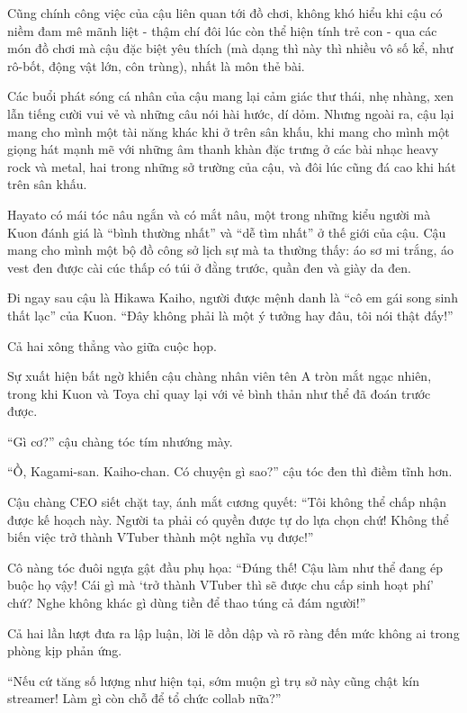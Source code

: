 \documentclass[../main.tex]{subfiles}
\begin{document}
Cũng chính công việc của cậu liên quan tới đồ chơi, không khó hiểu khi cậu có niềm đam mê mãnh liệt - thậm chí đôi lúc còn thể hiện tính trẻ con - qua các món đồ chơi mà cậu đặc biệt yêu thích (mà dạng thì này thì nhiều vô số kể, như rô-bốt, động vật lớn, côn trùng), nhất là môn thẻ bài.

Các buổi phát sóng cá nhân của cậu mang lại cảm giác thư thái, nhẹ nhàng, xen lẫn tiếng cười vui vẻ và những câu nói hài hước, dí dỏm. Nhưng ngoài ra, cậu lại mang cho mình một tài năng khác khi ở trên sân khấu, khi mang cho mình một giọng hát mạnh mẽ với những âm thanh khàn đặc trưng ở các bài nhạc heavy rock và metal, hai trong những sở trường của cậu, và đôi lúc cũng đá cao khi hát trên sân khấu.

Hayato có mái tóc nâu ngắn và có mắt nâu, một trong những kiểu người mà Kuon đánh giá là ``bình thường nhất'' và ``dễ tìm nhất'' ở thế giới của cậu. Cậu mang cho mình một bộ đồ công sở lịch sự mà ta thường thấy: áo sơ mi trắng, áo vest đen được cài cúc thấp có túi ở đằng trước, quần đen và giày da đen.

\chrint

Đi ngay sau cậu là Hikawa Kaiho, người được mệnh danh là ``cô em gái song sinh thất lạc'' của Kuon. ``Đây không phải là một ý tưởng hay đâu, tôi nói thật đấy!''

Cả hai xông thẳng vào giữa cuộc họp.

Sự xuất hiện bất ngờ khiến cậu chàng nhân viên tên A tròn mắt ngạc nhiên, trong khi Kuon và Toya chỉ quay lại với vẻ bình thản như thể đã đoán trước được.

``Gì cơ?'' cậu chàng tóc tím nhướng mày.

``Ồ, Kagami-san. Kaiho-chan. Có chuyện gì sao?'' cậu tóc đen thì điềm tĩnh hơn.

Cậu chàng CEO siết chặt tay, ánh mắt cương quyết: ``Tôi không thể chấp nhận được kế hoạch này. Người ta phải có quyền được tự do lựa chọn chứ! Không thể biến việc trở thành VTuber thành một nghĩa vụ được!''

Cô nàng tóc đuôi ngựa gật đầu phụ họa: ``Đúng thế! Cậu làm như thể đang ép buộc họ vậy! Cái gì mà `trở thành VTuber thì sẽ được chu cấp sinh hoạt phí' chứ? Nghe không khác gì dùng tiền để thao túng cả đám người!''

Cả hai lần lượt đưa ra lập luận, lời lẽ dồn dập và rõ ràng đến mức không ai trong phòng kịp phản ứng.

``Nếu cứ tăng số lượng như hiện tại, sớm muộn gì trụ sở này cũng chật kín streamer! Làm gì còn chỗ để tổ chức collab nữa?''
\end{document}
